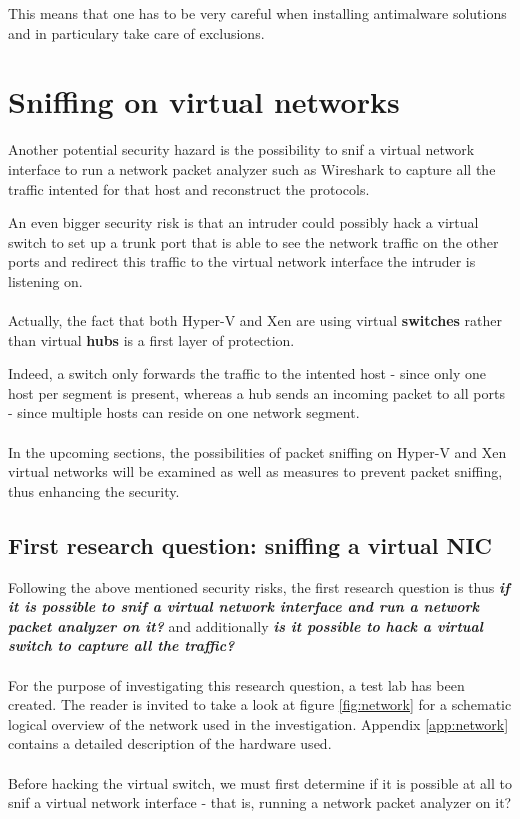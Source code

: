This means that one has to be very careful when installing antimalware solutions and in particulary take care of exclusions.

\section{Sniffing on virtual networks}

Another potential security hazard is the possibility to snif a virtual network interface to run a network packet analyzer such as Wireshark to capture all the traffic intented for that host and reconstruct the protocols.

An even bigger security risk is that an intruder could possibly hack a virtual switch to set up a trunk port that is able to see the network traffic on the other ports and redirect this traffic to the virtual network interface the intruder is listening on. \\ \\
Actually, the fact that both Hyper-V and Xen are using virtual \textbf{switches} rather than virtual \textbf{hubs} is a first layer of protection.

Indeed, a switch only forwards the traffic to the intented host - since only one host per segment is present, whereas a hub sends an incoming packet to all ports - since multiple hosts can reside on one network segment. \\ \\
In the upcoming sections, the possibilities of packet sniffing on Hyper-V and Xen virtual networks will be examined as well as measures to prevent packet sniffing, thus enhancing the security.

\subsection{First research question: sniffing a virtual NIC}

Following the above mentioned security risks, the first research question is thus \emph{\textbf{if it is possible to snif a virtual network interface and run a network packet analyzer on it?}} and additionally \emph{\textbf{is it possible to hack a virtual switch to capture all the traffic?}} \\ \\
For the purpose of investigating this research question, a test lab has been created. The reader is invited to take a look at figure \ref{fig:network} for a schematic logical overview of the network used in the investigation. Appendix \ref{app:network} contains a detailed description of the hardware used. \\ \\
Before hacking the virtual switch, we must first determine if it is possible at all to snif a virtual network interface - that is, running a network packet analyzer on it?

